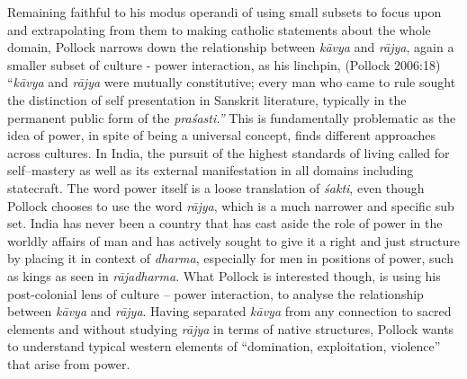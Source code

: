 Remaining faithful to his modus operandi of using small subsets to focus upon and extrapolating from them to making catholic statements about the whole domain, Pollock narrows down the relationship between \textit{kāvya} and \textit{rājya}, again a smaller subset of culture - power interaction, as his linchpin, (Pollock 2006:18) “\textit{kāvya} and \textit{rājya} were mutually constitutive; every man who came to rule sought the distinction of self presentation in Sanskrit literature, typically in the permanent public form of the \textit{praśasti.”} This is fundamentally problematic as the idea of power, in spite of being a universal concept, finds different approaches across cultures. In India, the pursuit of the highest standards of living called for self–mastery as well as its external manifestation in all domains including statecraft. The word power itself is a loose translation of \textit{śakti}, even though Pollock chooses to use the word \textit{rājya}, which is a much narrower and specific sub set. India has never been a country that has cast aside the role of power in the worldly affairs of man and has actively sought to give it a right and just structure by placing it in context of \textit{dharma}, especially for men in positions of power, such as kings as seen in \textit{rājadharma}. What Pollock is interested though, is using his post-colonial lens of culture – power interaction, to analyse the relationship between \textit{kāvya} and \textit{rājya}. Having separated \textit{kāvya} from any connection to sacred elements and without studying \textit{rājya} in terms of native structures, Pollock wants to understand typical western elements of “domination, exploitation, violence” that arise from power. 

